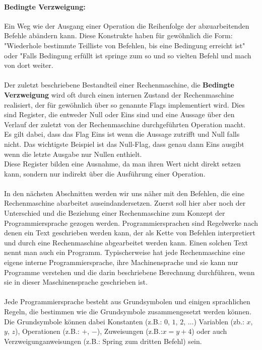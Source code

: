 \documentclass[11pt,a4paper,leqno]{report}
\numberwithin{equation}{chapter}
\begin{document}
\paragraph{Bedingte Verzweigung:} Ein Weg wie der Ausgang einer Operation die Reihenfolge der abzuarbeitenden Befehle ab\"andern kann. Diese Konstrukte haben f\"ur gew\"ohnlich die Form: "Wiederhole bestimmte Teilliste von Befehlen, bis eine Bedingung erreicht ist" oder "Falls Bedingung erf\"ullt ist springe zum so und so vielten Befehl und mach von dort weiter.
\\
\\
Der zuletzt beschriebene Bestandteil einer Rechenmaschine, die \textbf{Bedingte Verzweigung} wird oft durch einen internen Zustand der Rechenmaschine realisiert, der f\"ur gew\"ohnlich \"uber so genannte Flags implementiert wird. 
Dies sind Register, die entweder Null oder Eins sind und eine Aussage \"uber den Verlauf der zuletzt von der Rechenmaschine durchgef\"uhrten Operation macht.\\
Es gilt dabei, dass das Flag Eins ist wenn die Aussage zutrifft und Null falls nicht. Das wichtigste Beispiel ist das Null-Flag, dass genau dann Eins ausgibt wenn die letzte Ausgabe nur Nullen enthielt.\\
Diese Register bilden eine Ausnahme, da man ihren Wert nicht direkt setzen kann, sondern nur indirekt \"uber die Ausf\"uhrung einer Operation.\\
\\
In den n\"achsten Abschnitten werden wir uns n\"aher mit den Befehlen, die eine Rechenmaschine abarbeitet auseindandersetzen. Zuerst soll hier aber noch der Unterschied und die Beziehung einer Rechenmaschine zum Konzept der Programmiersprache gezogen werden. Programmiersprachen sind Regelwerke nach denen ein Text geschrieben werden kann, der als Kette von Befehlen interpretiert und durch eine Rechenmaschine abgearbeitet werden kann.
Einen solchen Text nennt man auch ein Programm.
Typischerweise hat jede Rechenmaschine eine eigene interne Programmiersprache, ihre Machinensprache und sie kann nur Programme verstehen und die darin beschriebene Berechnung durchf\"uhren, wenn sie in dieser Maschinensprache geschrieben ist.
\\
\\
Jede Programmiersprache besteht aus Grundsymbolen und einigen sprachlichen Regeln, die bestimmen wie die Grundsymbole zusammengesetzt werden k\"onnen. Die Grundsymbole k\"onnen dabei Konstanten (z.B.: $0$, $1$, $2$, $\dots$) Variablen (zb.: $x$, $y$, $z$), Operationen (z.B.: $+$, $-$), Zuweisungen (z.B.:$x = y + 4$) oder auch Verzweigunganweisungen (z.B.: Spring zum dritten Befehl) sein.\\
\end{document}
